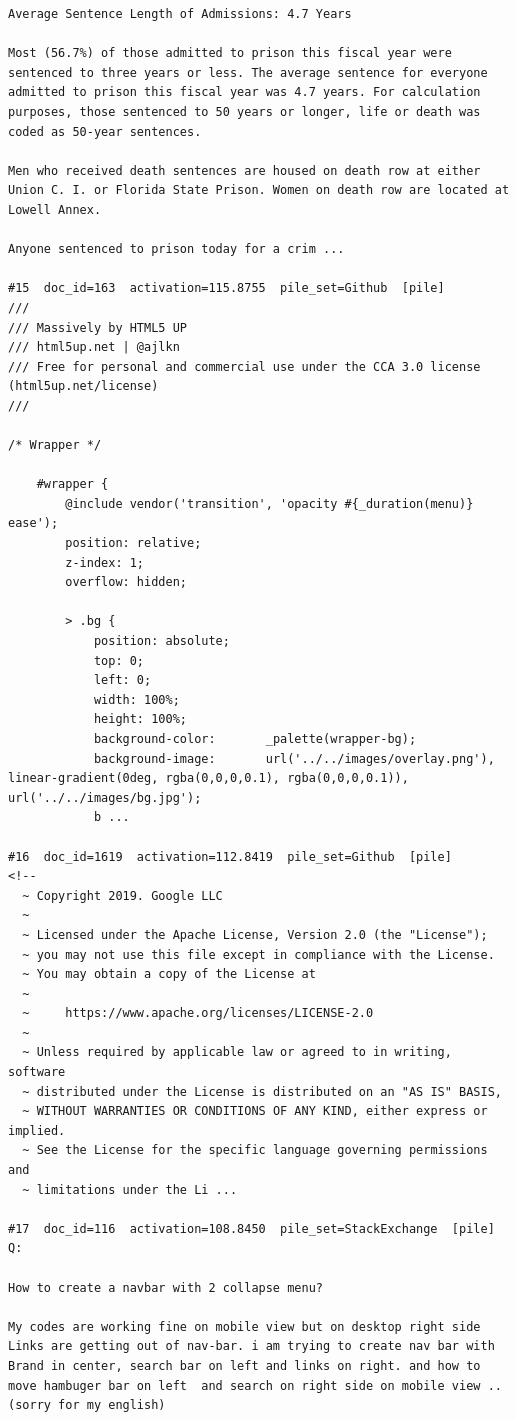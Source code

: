 \begin{verbatim}
Average Sentence Length of Admissions: 4.7 Years

Most (56.7%) of those admitted to prison this fiscal year were sentenced to three years or less. The average sentence for everyone admitted to prison this fiscal year was 4.7 years. For calculation purposes, those sentenced to 50 years or longer, life or death was coded as 50-year sentences.

Men who received death sentences are housed on death row at either Union C. I. or Florida State Prison. Women on death row are located at Lowell Annex.

Anyone sentenced to prison today for a crim ...

#15  doc_id=163  activation=115.8755  pile_set=Github  [pile]
///
/// Massively by HTML5 UP
/// html5up.net | @ajlkn
/// Free for personal and commercial use under the CCA 3.0 license (html5up.net/license)
///

/* Wrapper */

	#wrapper {
		@include vendor('transition', 'opacity #{_duration(menu)} ease');
		position: relative;
		z-index: 1;
		overflow: hidden;

		> .bg {
			position: absolute;
			top: 0;
			left: 0;
			width: 100%;
			height: 100%;
			background-color:		_palette(wrapper-bg);
			background-image:		url('../../images/overlay.png'),	linear-gradient(0deg, rgba(0,0,0,0.1), rgba(0,0,0,0.1)),	url('../../images/bg.jpg');
			b ...

#16  doc_id=1619  activation=112.8419  pile_set=Github  [pile]
<!--
  ~ Copyright 2019. Google LLC
  ~
  ~ Licensed under the Apache License, Version 2.0 (the "License");
  ~ you may not use this file except in compliance with the License.
  ~ You may obtain a copy of the License at
  ~
  ~     https://www.apache.org/licenses/LICENSE-2.0
  ~
  ~ Unless required by applicable law or agreed to in writing, software
  ~ distributed under the License is distributed on an "AS IS" BASIS,
  ~ WITHOUT WARRANTIES OR CONDITIONS OF ANY KIND, either express or implied.
  ~ See the License for the specific language governing permissions and
  ~ limitations under the Li ...

#17  doc_id=116  activation=108.8450  pile_set=StackExchange  [pile]
Q:

How to create a navbar with 2 collapse menu?

My codes are working fine on mobile view but on desktop right side Links are getting out of nav-bar. i am trying to create nav bar with Brand in center, search bar on left and links on right. and how to move hambuger bar on left  and search on right side on mobile view .. (sorry for my english) 


\end{verbatim}
